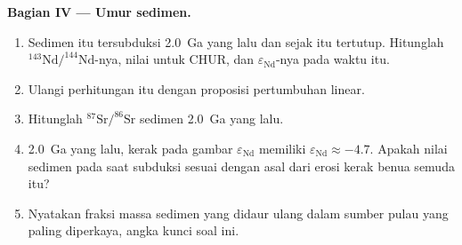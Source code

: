 \begin{problem}
\noindent\textbf{Bagian IV --- Umur sedimen.}
\begin{enumerate}[resume]
\item Sedimen itu tersubduksi \qty{2.0}{Ga} yang lalu dan sejak itu tertutup.
Hitunglah $^{143}\mathrm{Nd}/^{144}\mathrm{Nd}$-nya, nilai untuk CHUR, dan
$\varepsilon_{\mathrm{Nd}}$-nya pada waktu itu.
\item Ulangi perhitungan itu dengan proposisi pertumbuhan linear.
\item Hitunglah $^{87}\mathrm{Sr}/^{86}\mathrm{Sr}$ sedimen \qty{2.0}{Ga} yang lalu.
\item \qty{2.0}{Ga} yang lalu, kerak pada gambar $\varepsilon_{\mathrm{Nd}}$ memiliki
$\varepsilon_{\mathrm{Nd}} \approx -4.7$. Apakah nilai sedimen pada saat subduksi sesuai
dengan asal dari erosi kerak benua semuda itu?
\item Nyatakan fraksi massa sedimen yang didaur ulang dalam sumber pulau yang paling
diperkaya, angka kunci soal ini.
\end{enumerate}
\end{problem}
